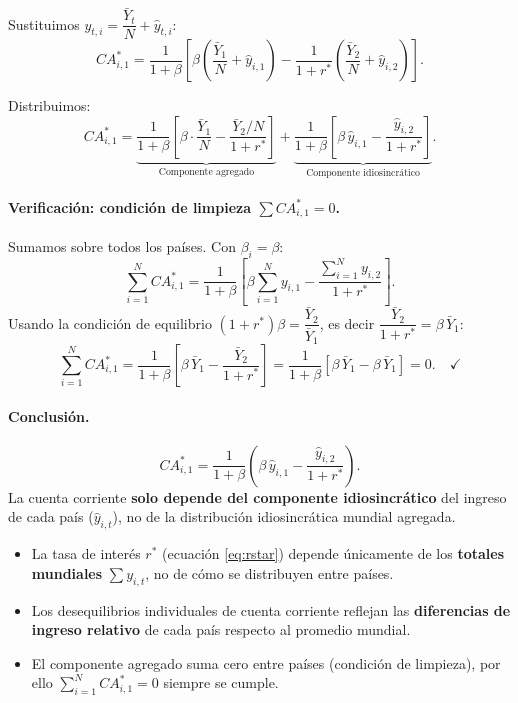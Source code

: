 Sustituimos $y_{t,i} = \dfrac{\bar{Y}_t}{N} + \hat{y}_{t,i}$:
\[
    CA_{i,1}^* = \frac{1}{1+\beta}
    \left[\beta\left(\frac{\bar{Y}_1}{N} + \hat{y}_{i,1}\right)
    - \frac{1}{1+r^*}\left(\frac{\bar{Y}_2}{N} + \hat{y}_{i,2}\right)\right].
\]

Distribuimos:
\[
    CA_{i,1}^* = \underbrace{\frac{1}{1+\beta}
    \left[\beta\cdot\frac{\bar{Y}_1}{N} - \frac{\bar{Y}_2/N}{1+r^*}\right]}_{\text{Componente agregado}}
    + \underbrace{\frac{1}{1+\beta}
    \left[\beta\,\hat{y}_{i,1} - \frac{\hat{y}_{i,2}}{1+r^*}\right]}_{\text{Componente idiosincrático}}.
\]

\paragraph{Verificación: condición de limpieza $\sum CA_{i,1}^* = 0$.}

Sumamos sobre todos los países. Con $\beta_i = \beta$:
\[
    \sum_{i=1}^N CA_{i,1}^* = \frac{1}{1+\beta}
    \left[\beta\sum_{i=1}^N y_{i,1} - \frac{\sum_{i=1}^N y_{i,2}}{1+r^*}\right].
\]
Usando la condición de equilibrio $(1+r^*)\beta = \dfrac{\bar{Y}_2}{\bar{Y}_1}$,
es decir $\dfrac{\bar{Y}_2}{1+r^*} = \beta\,\bar{Y}_1$:
\[
    \sum_{i=1}^N CA_{i,1}^* = \frac{1}{1+\beta}
    \left[\beta\,\bar{Y}_1 - \frac{\bar{Y}_2}{1+r^*}\right]
    = \frac{1}{1+\beta}\left[\beta\,\bar{Y}_1 - \beta\,\bar{Y}_1\right] = 0.
    \quad\checkmark
\]

\paragraph{Conclusión.}

\begin{resultado}
\[
    CA_{i,1}^* = \frac{1}{1+\beta}
    \left(\beta\,\hat{y}_{i,1} - \frac{\hat{y}_{i,2}}{1+r^*}\right).
\]
La cuenta corriente \textbf{solo depende del componente idiosincrático}
del ingreso de cada país ($\hat{y}_{i,t}$), no de la distribución
idiosincrática mundial agregada.
\end{resultado}

\begin{interpretacion}
\begin{itemize}
    \item La tasa de interés $r^*$ (ecuación \eqref{eq:rstar}) depende
          únicamente de los \textbf{totales mundiales} $\sum y_{i,t}$, no de
          cómo se distribuyen entre países.
    \item Los desequilibrios individuales de cuenta corriente reflejan las
          \textbf{diferencias de ingreso relativo} de cada país respecto al
          promedio mundial.
    \item El componente agregado suma cero entre países (condición de limpieza),
          por ello $\sum_{i=1}^N CA_{i,1}^* = 0$ siempre se cumple.
\end{itemize}
\end{interpretacion}
